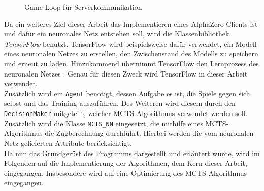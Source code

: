 \documentclass[12pt,a4paper,bibliography=totocnumbered,listof=totocnumbered]{article}
\begin{document}
\begin{figure}[h]
\centering
{}
\caption{Game-Loop für Serverkommunikation}
\label{abb:sa_gameloop}
\end{figure}

Da ein weiteres Ziel dieser Arbeit das Implementieren eines AlphaZero-Clients ist und dafür ein neuronales Netz entstehen soll, wird die Klassenbibliothek \textit{TensorFlow} benutzt. TensorFlow wird beispielsweise dafür verwendet, ein Modell eines neuronalen Netzes zu erstellen, den Zwischenstand des Modells zu speichern und erneut zu laden. Hinzukommend übernimmt TensorFlow den Lernprozess des neuronalen Netzes \citep[S. 388 f.]{Krohn.2020}. Genau für diesen Zweck wird TensorFlow in dieser Arbeit verwendet.\\
Zusätzlich wird ein \texttt{Agent} benötigt, dessen Aufgabe es ist, die Spiele gegen sich selbst und das Training auszuführen. Des Weiteren wird diesem durch den \texttt{DecisionMaker} mitgeteilt, welcher MCTS-Algorithmus verwendet werden soll. Zusätzlich wird die Klasse \texttt{MCTS\_NN} eingesetzt, die mithilfe eines MCTS-Algorithmus die Zugberechnung durchführt. Hierbei werden die vom neuronalen Netz gelieferten Attribute berücksichtigt.\\
Da nun das Grundgerüst des Programms dargestellt und erläutert wurde, wird im Folgenden auf die Implementierung der Algorithmen, dem Kern dieser Arbeit, eingegangen. Insbesondere wird auf eine Optimierung des MCTS-Algorithmus eingegangen.
\end{document}
